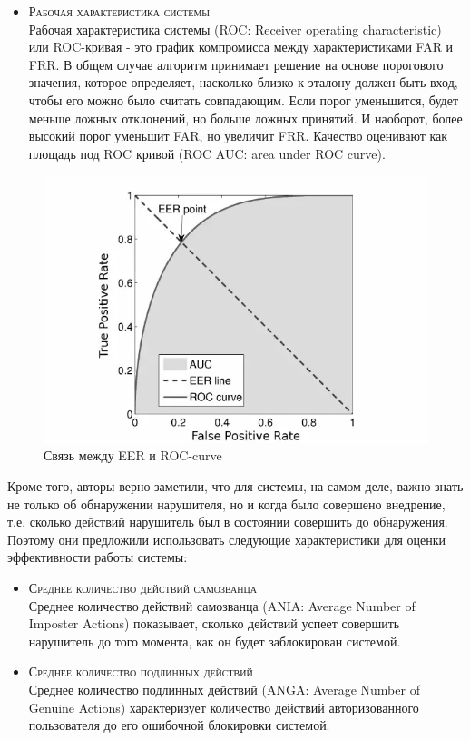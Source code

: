 \documentclass[12pt]{article}
\begin{document}
    \begin{itemize}
        \item \textsc{Рабочая характеристика системы} \\
        Рабочая характеристика системы (ROC: Receiver operating characteristic) или ROC-кривая - это график компромисса между характеристиками FAR и FRR. В общем случае алгоритм принимает решение на основе порогового значения, которое определяет, насколько близко к эталону должен быть вход, чтобы его можно было считать совпадающим. Если порог уменьшится, будет меньше ложных отклонений, но больше ложных принятий. И наоборот, более высокий порог уменьшит FAR, но увеличит FRR. Качество оценивают как площадь под ROC кривой (ROC AUC: area under ROC curve).
    \end{itemize}

    \begin{figure}[h!]
        \centering
        \includegraphics[width=0.6\linewidth]{EER_ROC.png}
        \caption{Связь между EER и ROC-curve}
        \label{sec:Overview:Metrics:fig:EER_ROC}
    \end{figure}

    \par Кроме того, авторы \cite{Mondal} верно заметили, что для системы, на самом деле, важно знать не только об обнаружении нарушителя, но и когда было совершено внедрение, т.е. сколько действий нарушитель был в состоянии совершить до обнаружения. Поэтому они предложили использовать следующие характеристики для оценки эффективности работы системы:

    \begin{itemize}
        \item \textsc{Среднее количество действий самозванца} \\
        Среднее количество действий самозванца (ANIA: Average Number of Imposter Actions) показывает, сколько действий успеет совершить нарушитель до того момента, как он будет заблокирован системой.
        \item \textsc{Среднее количество подлинных действий} \\
        Среднее количество подлинных действий (ANGA: Average Number of Genuine Actions) характеризует количество действий авторизованного пользователя до его ошибочной блокировки системой.
    \end{itemize}
\end{document}
